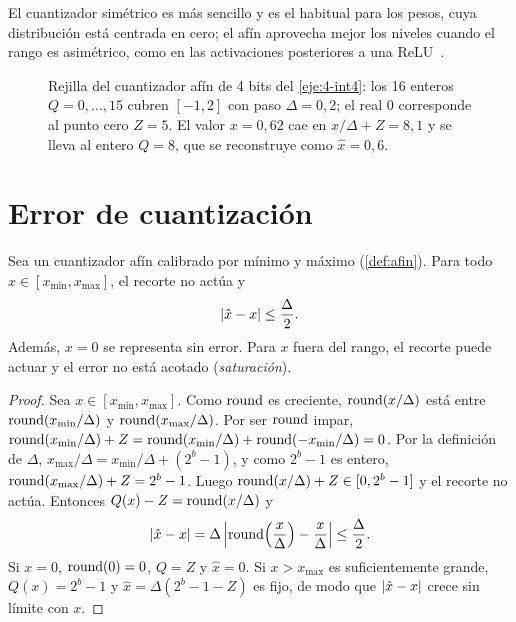 El cuantizador simétrico es más sencillo y es el habitual para los pesos, cuya distribución está centrada en cero; el afín aprovecha mejor los niveles cuando el rango es asimétrico, como en las activaciones posteriores a una ReLU~\cite{mit65940}.

\begin{figure}[h]
\centering
{}
\caption{Rejilla del cuantizador afín de 4 bits del \cref{eje:4-int4}: los 16 enteros $Q=0,\dots,15$ cubren $[-1,2]$ con paso $\Delta=0{,}2$; el real $0$ corresponde al punto cero $Z=5$. El valor $x=0{,}62$ cae en $x/\Delta+Z=8{,}1$ y se lleva al entero $Q=8$, que se reconstruye como $\hat x=0{,}6$.}
\label{fig:rejilla}
\end{figure}

\section{Error de cuantización}

\begin{teorema}\label{teo:error-cuant}
Sea un cuantizador afín calibrado por mínimo y máximo (\cref{def:afin}). Para todo $x\in[x_{\min},x_{\max}]$, el recorte no actúa y
\[
\lvert\hat x-x\rvert\le\frac{\Delta}{2}.
\]
Además, $x=0$ se representa sin error. Para $x$ fuera del rango, el recorte puede actuar y el error no está acotado (\emph{saturación}).
\end{teorema}

\begin{proof}
Sea $x\in[x_{\min},x_{\max}]$. Como $\operatorname{round}$ es creciente, $\operatorname{round}(x/\Delta)$ está entre $\operatorname{round}(x_{\min}/\Delta)$ y $\operatorname{round}(x_{\max}/\Delta)$. Por ser $\operatorname{round}$ impar, $\operatorname{round}(x_{\min}/\Delta)+Z=\operatorname{round}(x_{\min}/\Delta)+\operatorname{round}(-x_{\min}/\Delta)=0$. Por la definición de $\Delta$, $x_{\max}/\Delta=x_{\min}/\Delta+(2^{b}-1)$, y como $2^{b}-1$ es entero, $\operatorname{round}(x_{\max}/\Delta)+Z=2^{b}-1$. Luego $\operatorname{round}(x/\Delta)+Z\in[0,2^{b}-1]$ y el recorte no actúa. Entonces $Q(x)-Z=\operatorname{round}(x/\Delta)$ y
\[
\lvert\hat x-x\rvert=\Delta\,\Bigl|\operatorname{round}\Bigl(\frac{x}{\Delta}\Bigr)-\frac{x}{\Delta}\Bigr|\le\frac{\Delta}{2}.
\]
Si $x=0$, $\operatorname{round}(0)=0$, $Q=Z$ y $\hat x=0$. Si $x>x_{\max}$ es suficientemente grande, $Q(x)=2^{b}-1$ y $\hat x=\Delta(2^{b}-1-Z)$ es fijo, de modo que $\lvert\hat x-x\rvert$ crece sin límite con $x$.
\end{proof}

